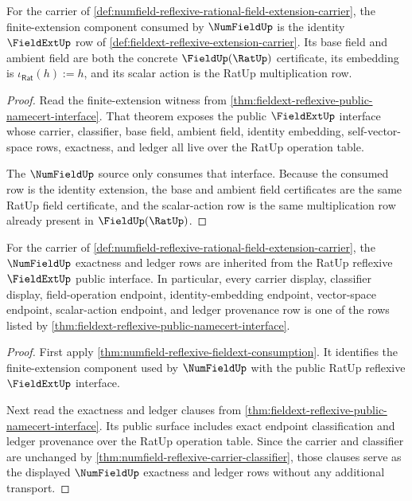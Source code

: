 \begin{theorem}
\label{thm:numfield-reflexive-fieldext-consumption}
For the carrier of
\autoref{def:numfield-reflexive-rational-field-extension-carrier}, the
finite-extension component consumed by $\NumFieldUp$ is the identity
$\FieldExtUp$ row of \autoref{def:fieldext-reflexive-extension-carrier}. Its
base field and ambient field are both the concrete $\FieldUp(\RatUp)$
certificate, its embedding is $\iota_{\mathsf{Rat}}(h):=h$, and its scalar
action is the RatUp multiplication row.
\end{theorem}
\begin{proof}
Read the finite-extension witness from
\autoref{thm:fieldext-reflexive-public-namecert-interface}. That theorem
exposes the public $\FieldExtUp$ interface whose carrier, classifier, base
field, ambient field, identity embedding, self-vector-space rows, exactness,
and ledger all live over the RatUp operation table.

The $\NumFieldUp$ source only consumes that interface. Because the consumed row
is the identity extension, the base and ambient field certificates are the same
RatUp field certificate, and the scalar-action row is the same multiplication
row already present in $\FieldUp(\RatUp)$.
\end{proof}

\begin{theorem}
\label{thm:numfield-reflexive-ledger-exactness}
For the carrier of
\autoref{def:numfield-reflexive-rational-field-extension-carrier}, the
$\NumFieldUp$ exactness and ledger rows are inherited from the RatUp reflexive
$\FieldExtUp$ public interface. In particular, every carrier display,
classifier display, field-operation endpoint, identity-embedding endpoint,
vector-space endpoint, scalar-action endpoint, and ledger provenance row is one
of the rows listed by
\autoref{thm:fieldext-reflexive-public-namecert-interface}.
\end{theorem}
\begin{proof}
First apply
\autoref{thm:numfield-reflexive-fieldext-consumption}. It identifies the
finite-extension component used by $\NumFieldUp$ with the public RatUp
reflexive $\FieldExtUp$ interface.

Next read the exactness and ledger clauses from
\autoref{thm:fieldext-reflexive-public-namecert-interface}. Its public surface
includes exact endpoint classification and ledger provenance over the RatUp
operation table. Since the carrier and classifier are unchanged by
\autoref{thm:numfield-reflexive-carrier-classifier}, those clauses serve as the
displayed $\NumFieldUp$ exactness and ledger rows without any additional
transport.
\end{proof}

